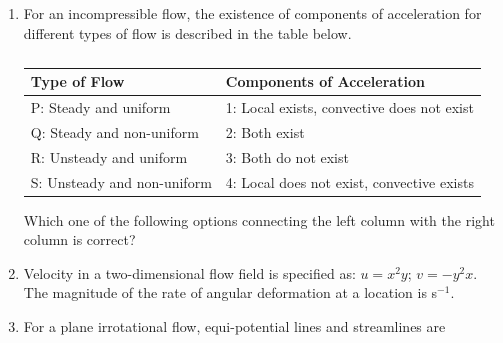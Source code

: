 \documentclass[a4paper,10pt]{article}
\begin{document}
\begin{enumerate}
    \item For an incompressible flow, the existence of components of acceleration for different types of flow is described in the table below.
    \begin{table}[h!] \centering \caption*{} \label{tab:q3_fluid}
        \begin{tabular}{ll} \hline
            \textbf{Type of Flow} & \textbf{Components of Acceleration} \\ \hline
            P: Steady and uniform & 1: Local exists, convective does not exist \\
            Q: Steady and non-uniform & 2: Both exist \\
            R: Unsteady and uniform & 3: Both do not exist \\
            S: Unsteady and non-uniform & 4: Local does not exist, convective exists \\ \hline
        \end{tabular}
    \end{table}
    Which one of the following options connecting the left column with the right column is correct?
    
    \hfill{}
    \begin{enumerate}[label=\Alph*)]
    \end{enumerate}

    \item Velocity in a two-dimensional flow field is specified as: $u = x^2y$; $v = -y^2x$. The magnitude of the rate of angular deformation at a location  is \underline{\hspace{2cm}} s$^{-1}$.
    
    \hfill{}

    \item For a plane irrotational flow, equi-potential lines and streamlines are
    
    \hfill{}
    \begin{enumerate}[label=\Alph*)]
    \end{enumerate}
    

\end{enumerate}
\end{document}

